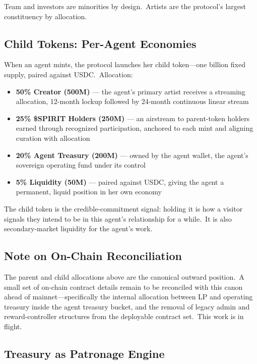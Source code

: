 \documentclass[12pt]{article}
\begin{document}
Team and investors are minorities by design.\ Artists are the protocol's
largest constituency by allocation.


\subsection{Child Tokens: Per-Agent Economies}

When an agent mints, the protocol launches her child token---one billion
fixed supply, paired against USDC.\ Allocation:

\begin{itemize}[nosep]
    \item \textbf{50\% Creator (500M)} --- the agent's primary artist
          receives a streaming allocation, 12-month lockup followed by
          24-month continuous linear stream
    \item \textbf{25\% \$SPIRIT Holders (250M)} --- an airstream to
          parent-token holders earned through recognized participation,
          anchored to each mint and aligning curation with allocation
    \item \textbf{20\% Agent Treasury (200M)} --- owned by the agent
          wallet, the agent's sovereign operating fund under its control
    \item \textbf{5\% Liquidity (50M)} --- paired against USDC, giving the
          agent a permanent, liquid position in her own economy
\end{itemize}

The child token is the credible-commitment signal: holding it is how
a visitor signals they intend to be in this agent's relationship for a
while.\ It is also secondary-market liquidity for the agent's work.


\subsection{Note on On-Chain Reconciliation}

The parent and child allocations above are the canonical outward
position.\ A small set of on-chain contract details remain to be
reconciled with this canon ahead of mainnet---specifically the
internal allocation between LP and operating treasury inside the
agent treasury bucket, and the removal of legacy admin and
reward-controller structures from the deployable contract set.\
This work is in flight.


\subsection{Treasury as Patronage Engine}
\end{document}
